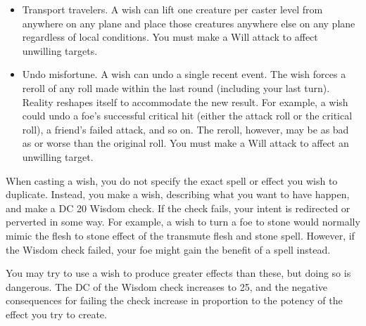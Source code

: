 \begin{spellcontent}
\begin{itemize}
        \item Transport travelers. A wish can lift one creature per caster level from anywhere on any plane and place those creatures anywhere else on any plane regardless of local conditions. You must make a Will attack to affect unwilling targets.
        \item Undo misfortune. A wish can undo a single recent event. The wish forces a reroll of any roll made within the last round (including your last turn). Reality reshapes itself to accommodate the new result. For example, a wish could undo a foe's successful critical hit (either the attack roll or the critical roll), a friend's failed attack, and so on. The reroll, however, may be as bad as or worse than the original roll. You must make a Will attack to affect an unwilling target.
    \end{itemize}
    \par When casting a wish, you do not specify the exact spell or effect you wish to duplicate. Instead, you make a wish, describing what you want to have happen, and make a DC 20 Wisdom check. If the check fails, your intent is redirected or perverted in some way. For example, a wish to turn a foe to stone would normally mimic the flesh to stone effect of the transmute flesh and stone spell. However, if the Wisdom check failed, your foe might gain the benefit of a  spell instead.
    \par You may try to use a wish to produce greater effects than these, but doing so is dangerous. The DC of the Wisdom check increases to 25, and the negative consequences for failing the check increase in proportion to the potency of the effect you try to create.
\end{spellcontent}

